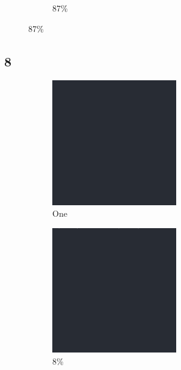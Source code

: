 \documentclass[12pt, fleqn]{report}                             %
\theoremstyle{break}                                            %
\begin{document}
\begin{figure}[ht!]
\begin{subfigure}[b]{0.4\linewidth}
          \caption{87\%}
        \end{subfigure}
      \end{figure}


      \clearpage
      \subsection{8}
      \begin{figure}[ht!]
        \centering
        \begin{subfigure}[b]{0.4\linewidth}
          \includegraphics[width=0.6\textwidth]{Images/8/a.png}
          \caption{One}
        \end{subfigure}
        \begin{subfigure}[b]{0.4\linewidth}
          \includegraphics[width=0.6\textwidth]{Images/8/b.png}
          \caption{8\%}
        \end{subfigure}
        \begin{subfigure}[b]{0.4\linewidth}

\end{subfigure}
\end{figure}
\end{document}
